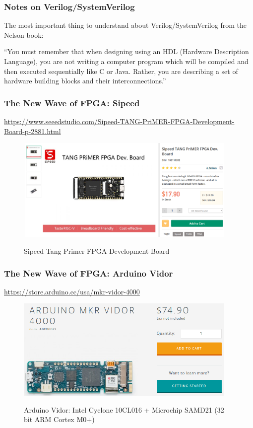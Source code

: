 \documentclass{beamer}
\begin{document}
\begin{frame}
\frametitle{Notes on Verilog/SystemVerilog}

The most important thing to understand about Verilog/SystemVerilog from the Nelson book:

``You must remember that when designing using an HDL (Hardware Description Language), you are not writing a computer program which will be compiled and then executed sequentially like C or Java.  Rather, you are describing a set of hardware building blocks and their interconnections.''

\end{frame}

\begin{frame}
\frametitle{The New Wave of FPGA: Sipeed}

\begin{tiny}
\url{https://www.seeedstudio.com/Sipeed-TANG-PriMER-FPGA-Development-Board-p-2881.html}
\end{tiny}

\begin{figure}[h]
	\centering
	\includegraphics[width=0.95\textwidth]{graphics/sispeed_tang_fpga.png}
	\centering\bfseries
	\caption{Sipeed Tang Primer FPGA Development Board}
\end{figure}

\end{frame}

\begin{frame}
\frametitle{The New Wave of FPGA: Arduino Vidor}

\url{https://store.arduino.cc/usa/mkr-vidor-4000}

\begin{figure}[h]
	\centering
	\includegraphics[width=0.95\textwidth]{graphics/arduino_vidor.png}
	\centering\bfseries
	\caption{Arduino Vidor:  Intel Cyclone 10CL016 + Microchip SAMD21 (32 bit ARM Cortex M0+)}
\end{figure}


\end{frame}
\end{document}
